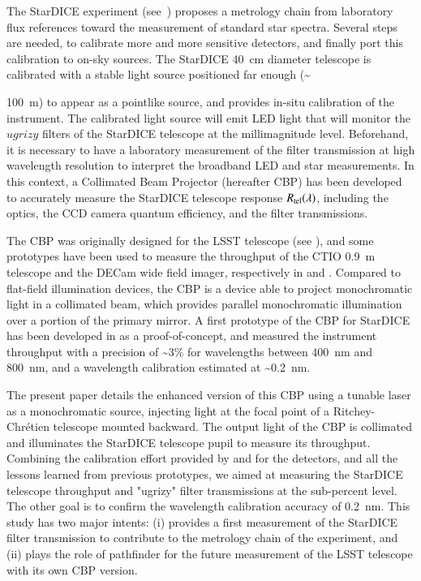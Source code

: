 The StarDICE experiment (see~\citealt{Betoule_2023}) proposes a metrology chain from laboratory flux references toward the measurement of standard star spectra. Several steps are needed, to calibrate more and more sensitive detectors, and finally port this calibration to on-sky sources. The StarDICE \SI{40}{\centi\meter} diameter telescope is calibrated with a stable light source positioned far enough (\textasciitilde {\SI{100}{\meter}) to appear as a pointlike source, and provides in-situ calibration of the instrument. The calibrated light source will emit LED light that will monitor the $ugrizy$ filters of the StarDICE telescope at the millimagnitude level. Beforehand, it is necessary to have a laboratory measurement of the filter transmission at high wavelength resolution to interpret the broadband LED and star measurements. In this context, a Collimated Beam Projector (hereafter CBP) has been developed to accurately measure the StarDICE telescope response $R_{\mathrm{tel}}(\lambda)$, including the optics, the CCD camera quantum efficiency, and the filter transmissions. 

The CBP was originally designed for the LSST telescope (see \citealt{ingraham2016}), and some prototypes have been used to measure the throughput of the CTIO \SI{0.9}{\meter} telescope and the DECam wide field imager, respectively in \cite{coughlin2018} and \cite{coughlin2016}. Compared to flat-field illumination devices, the CBP is a device able to project monochromatic light in a collimated beam, which provides parallel monochromatic illumination over a portion of the primary mirror. A first prototype of the CBP for StarDICE has been developed in \cite{Mondrik_2023} as a proof-of-concept, and measured the instrument throughput with a precision of \textasciitilde 3\% for wavelengths between \SI{400}{\nano\meter} and \SI{800}{\nano\meter}, and a wavelength calibration estimated at \textasciitilde \SI{0.2}{\nano\meter}. 

The present paper details the enhanced version of this CBP using a tunable laser as a monochromatic source, injecting light at the focal point of a Ritchey-Chrétien telescope mounted backward. The output light of the CBP is collimated and illuminates the StarDICE telescope pupil to measure its throughput. Combining the calibration effort provided by \cite{houston2008detectors} and \cite{solarcell} for the detectors, and all the lessons learned from previous prototypes, we aimed at measuring the StarDICE telescope throughput and "ugrizy" filter transmissions at the sub-percent level. The other goal is to confirm the wavelength calibration accuracy of \SI{0.2}{\nano\meter}. This study has two major intents: (i) provides a first measurement of the StarDICE filter transmission to contribute to the metrology chain of the experiment, and (ii) plays the role of pathfinder for the future measurement of the LSST telescope with its own CBP version.

}
